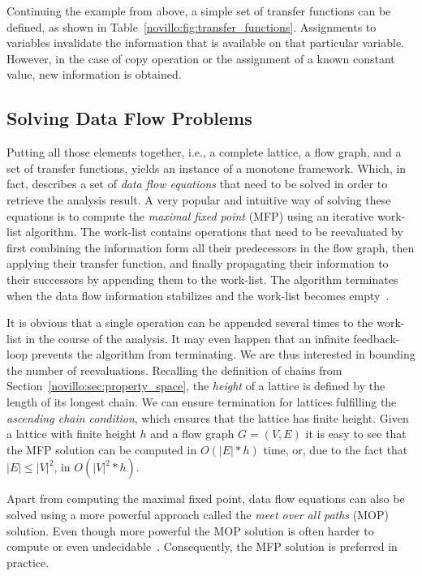 Continuing the example from above, a simple set of transfer functions can be
defined, as shown in Table~\ref{novillo:fig:transfer_functions}. Assignments to
variables invalidate the information that is available on that particular
variable. However, in the case of copy operation or the assignment of a known
constant value, new information is obtained.

\subsection{Solving Data Flow Problems}

Putting all those elements together, i.e., a complete lattice, a flow graph, and
a set of transfer functions, yields an instance of a monotone framework. Which,
in fact, describes a set of \emph{data flow equations} that need to be solved in
order to retrieve the analysis result. A very popular and intuitive way of
solving these equations is to compute the \emph{maximal fixed point} (MFP) using
an iterative work-list algorithm. The work-list contains operations that need
to be reevaluated by first combining the information form all their predecessors
in the flow graph, then applying their transfer function, and finally
propagating their information to their successors by appending them to the
work-list. The algorithm terminates when the data flow information stabilizes
and the work-list becomes empty~\cite{novillo:bib:NNH99}.

It is obvious that a single operation can be appended several times to the
work-list in the course of the analysis. It may even happen that an infinite
feedback-loop prevents the algorithm from terminating. We are thus interested in
bounding the number of reevaluations. Recalling the definition of chains from
Section~\ref{novillo:sec:property_space}, the \emph{height} of a lattice is
defined by the length of its longest chain. We can ensure termination for
lattices fulfilling the \emph{ascending chain condition}, which ensures that the
lattice has finite height. Given a lattice with finite height $h$ and a flow
graph $G=(V, E)$ it is easy to see that the MFP solution can be computed in
$O(|E|*h)$ time, or, due to the fact that $|E| \leq |V|^2$, in $O(|V|^2*h)$.

Apart from computing the maximal fixed point, data flow equations can also be
solved using a more powerful approach called the \emph{meet over all paths}
(MOP) solution. Even though more powerful the MOP solution is often harder to
compute or even undecidable~\cite{novillo:bib:NNH99}. Consequently, the MFP
solution is preferred in practice.

